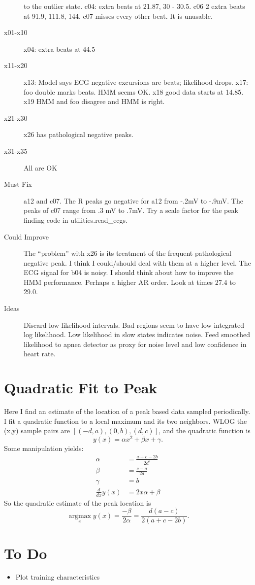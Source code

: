 \documentclass[12pt]{article}
\newcommand{\argmax}{\operatorname*{argmax}}
\begin{document}
\begin{description}
  to the outlier state.  c04: extra beats at 21.87, 30 - 30.5.  c06 2
  extra beats at 91.9, 111.8, 144.  c07 misses every other beat.  It
  is unusable.
\item[x01-x10] x04: extra beats at 44.5
\item[x11-x20] x13: Model says ECG negative excursions are beats;
  likelihood drops.  x17: foo double marks beats.  HMM seems OK.  x18
  good data starts at 14.85.  x19 HMM and foo disagree and HMM is
  right.
\item[x21-x30] x26 has pathological negative peaks.
\item[x31-x35] All are OK
\item[Must Fix] a12 and c07.  The R peaks go negative for a12 from
  -.2mV to -.9mV.  The peaks of c07 range from .3 mV to .7mV.  Try a
  scale factor for the peak finding code in utilities.read\_ecgs.
\item[Could Improve] The ``problem'' with x26 is its treatment of the
  frequent pathological negative peak.  I think I could/should deal
  with them at a higher level.  The ECG signal for b04 is noisy.  I
  should think about how to improve the HMM performance.  Perhaps a
  higher AR order.  Look at times 27.4 to 29.0.
\item[Ideas] Discard low likelihood intervals.  Bad regions seem to have low
integrated log likelihood.  Low likelihood in slow states indicates
noise.  Feed smoothed likelihood to apnea detector as proxy for noise
level and low confidence in heart rate.
\end{description}

\section{Quadratic Fit to Peak}
\label{sec:quadratic}

Here I find an estimate of the location of a peak based data sampled
periodically.  I fit a quadratic function to a local maximum and its
two neighbors.  WLOG the (x,y) sample pairs are $[(-d,a), (0,b),
(d,c)]$, and the quadratic function is
\begin{equation*}
  y(x) = \alpha x^2 + \beta x + \gamma.
\end{equation*}
Some manipulation yields:
\begin{align*}
  \alpha &= \frac{a+c-2b}{2d^2} \\
  \beta &= \frac{c-a}{2d} \\
  \gamma &= b \\
  \frac{d}{dx} y(x) &= 2x\alpha + \beta
\end{align*}
So the quadratic estimate of the peak location is
\begin{equation*}
  \argmax_x y(x) = \frac{-\beta}{2\alpha} = \frac{d(a-c)}{2(a+c-2b)}.
\end{equation*}

\section{To Do}
\label{sec:todo}

\begin{itemize}
\item Plot training characteristics
\end{itemize}
\end{document}
